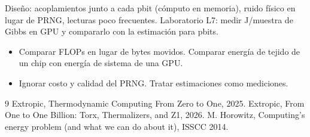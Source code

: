 \documentclass[11pt,a4paper]{article}
\begin{document}
\begin{aplicacion}
Diseño: acoplamientos junto a cada pbit (cómputo en memoria), ruido físico en lugar de PRNG, lecturas poco frecuentes. Laboratorio L7: medir J/muestra de
Gibbs en GPU y compararlo con la estimación para pbits.
\end{aplicacion}

\begin{error}
\begin{itemize}[nosep]
\item Comparar FLOPs en lugar de bytes movidos. \quad Comparar energía de tejido de un chip con energía de sistema de una GPU.
\item Ignorar costo y calidad del PRNG. \quad Tratar estimaciones \evE{} como mediciones.
\end{itemize}
\end{error}

\begin{thebibliography}{9}\small
{} Extropic, Thermodynamic Computing From Zero to One, 2025.
 Extropic, From One to One Billion: Torx, Thermalizers, and Z1, 2026.
 M. Horowitz, Computing's energy problem (and what we can do about it), ISSCC 2014.
\end{thebibliography}
\end{document}
